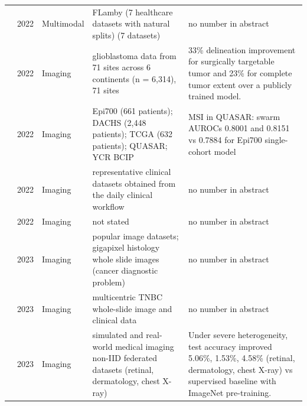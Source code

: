 \begin{longtable}{@{}p{2.6cm}p{0.7cm}p{1.2cm}p{4.4cm}p{4.6cm}@{}}
\cite{ogierduterrail2022flamby} & 2022 & Multimodal & FLamby (7 healthcare datasets with natural splits) (7 datasets) & no number in abstract\\
\cite{pati2022federated} & 2022 & Imaging & glioblastoma data from 71 sites across 6 continents (n = 6,314), 71 sites & 33\% delineation improvement for surgically targetable tumor and 23\% for complete tumor extent over a publicly trained model.\\
\cite{saldanha2022swarm} & 2022 & Imaging & Epi700 (661 patients); DACHS (2,448 patients); TCGA (632 patients); QUASAR; YCR BCIP & MSI in QUASAR: swarm AUROCs 0.8001 and 0.8151 vs 0.7884 for Epi700 single-cohort model\\
\cite{tedeschini2022decentralized} & 2022 & Imaging & representative clinical datasets obtained from the daily clinical workflow & no number in abstract\\
\cite{xu2022closing} & 2022 & Imaging & not stated & no number in abstract\\
\cite{kalra2023decentralized} & 2023 & Imaging & popular image datasets; gigapixel histology whole slide images (cancer diagnostic problem) & no number in abstract\\
\cite{ogierduterrail2023federated} & 2023 & Imaging & multicentric TNBC whole-slide image and clinical data & no number in abstract\\
\cite{yan2023label} & 2023 & Imaging & simulated and real-world medical imaging non-IID federated datasets (retinal, dermatology, chest X-ray) & Under severe heterogeneity, test accuracy improved 5.06\%, 1.53\%, 4.58\% (retinal, dermatology, chest X-ray) vs supervised baseline with ImageNet pre-training.\\
\bottomrule
\end{longtable}

